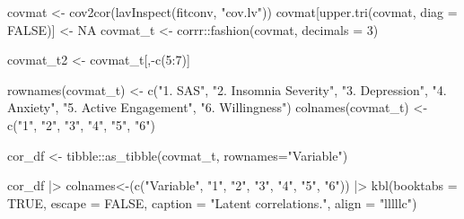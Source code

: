 \documentclass[
  letterpaper,
  DIV=11,
  numbers=noendperiod]{scrreprt}
\newenvironment{Shaded}{\begin{snugshade}}{\end{snugshade}}
\newcommand{\AttributeTok}[1]{\textcolor[rgb]{0.40,0.45,0.13}{#1}}
\newcommand{\ConstantTok}[1]{\textcolor[rgb]{0.56,0.35,0.01}{#1}}
\newcommand{\DecValTok}[1]{\textcolor[rgb]{0.68,0.00,0.00}{#1}}
\newcommand{\FunctionTok}[1]{\textcolor[rgb]{0.28,0.35,0.67}{#1}}
\newcommand{\NormalTok}[1]{\textcolor[rgb]{0.00,0.23,0.31}{#1}}
\newcommand{\OtherTok}[1]{\textcolor[rgb]{0.00,0.23,0.31}{#1}}
\newcommand{\SpecialCharTok}[1]{\textcolor[rgb]{0.37,0.37,0.37}{#1}}
\newcommand{\StringTok}[1]{\textcolor[rgb]{0.13,0.47,0.30}{#1}}
\begin{document}
\begin{Shaded}
\begin{Highlighting}[]
\NormalTok{covmat }\OtherTok{\textless{}{-}} \FunctionTok{cov2cor}\NormalTok{(}\FunctionTok{lavInspect}\NormalTok{(fitconv, }\StringTok{"cov.lv"}\NormalTok{))}
\NormalTok{covmat[}\FunctionTok{upper.tri}\NormalTok{(covmat, }\AttributeTok{diag =} \ConstantTok{FALSE}\NormalTok{)] }\OtherTok{\textless{}{-}} \ConstantTok{NA}
\NormalTok{covmat\_t }\OtherTok{\textless{}{-}}\NormalTok{ corrr}\SpecialCharTok{::}\FunctionTok{fashion}\NormalTok{(covmat, }\AttributeTok{decimals =} \DecValTok{3}\NormalTok{)}

\NormalTok{covmat\_t2 }\OtherTok{\textless{}{-}}\NormalTok{ covmat\_t[,}\SpecialCharTok{{-}}\FunctionTok{c}\NormalTok{(}\DecValTok{5}\SpecialCharTok{:}\DecValTok{7}\NormalTok{)]}

\FunctionTok{rownames}\NormalTok{(covmat\_t) }\OtherTok{\textless{}{-}} \FunctionTok{c}\NormalTok{(}\StringTok{"1. SAS"}\NormalTok{, }\StringTok{"2. Insomnia Severity"}\NormalTok{, }\StringTok{"3. Depression"}\NormalTok{, }\StringTok{"4. Anxiety"}\NormalTok{, }\StringTok{"5. Active Engagement"}\NormalTok{, }\StringTok{"6. Willingness"}\NormalTok{)}
\FunctionTok{colnames}\NormalTok{(covmat\_t) }\OtherTok{\textless{}{-}} \FunctionTok{c}\NormalTok{(}\StringTok{"1"}\NormalTok{, }\StringTok{"2"}\NormalTok{, }\StringTok{"3"}\NormalTok{, }\StringTok{"4"}\NormalTok{, }\StringTok{"5"}\NormalTok{, }\StringTok{"6"}\NormalTok{)}

\NormalTok{cor\_df }\OtherTok{\textless{}{-}}\NormalTok{ tibble}\SpecialCharTok{::}\FunctionTok{as\_tibble}\NormalTok{(covmat\_t, }\AttributeTok{rownames=}\StringTok{"Variable"}\NormalTok{)}

\NormalTok{cor\_df }\SpecialCharTok{|\textgreater{}} 
  \StringTok{\textasciigrave{}}\AttributeTok{colnames\textless{}{-}}\StringTok{\textasciigrave{}}\NormalTok{(}\FunctionTok{c}\NormalTok{(}\StringTok{"Variable"}\NormalTok{, }\StringTok{"1"}\NormalTok{, }\StringTok{"2"}\NormalTok{, }\StringTok{"3"}\NormalTok{, }\StringTok{"4"}\NormalTok{, }\StringTok{"5"}\NormalTok{, }\StringTok{"6"}\NormalTok{)) }\SpecialCharTok{|\textgreater{}} 
  \FunctionTok{kbl}\NormalTok{(}\AttributeTok{booktabs =} \ConstantTok{TRUE}\NormalTok{, }\AttributeTok{escape =} \ConstantTok{FALSE}\NormalTok{,}
      \AttributeTok{caption =} \StringTok{"Latent correlations."}\NormalTok{, }
      \AttributeTok{align =} \StringTok{"lllllc"}\NormalTok{)}
\end{Highlighting}
\end{Shaded}
\end{document}
